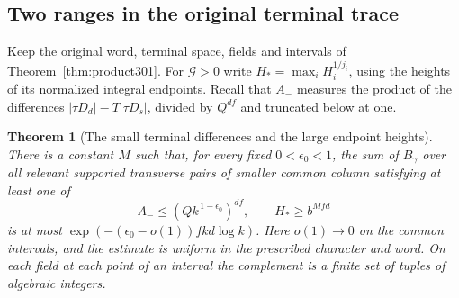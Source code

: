 \documentclass[a4paper,11pt]{article}
\newtheorem{theorem}[proposition]{Theorem}
\theoremstyle{definition}
\theoremstyle{remark}
\numberwithin{equation}{section}
\begin{document}
\subsection{Two ranges in the original terminal trace}\label{nav:VII-59}
Keep the original word, terminal space, fields and intervals
of Theorem~\ref{thm:product301}. For \(\mathcal G>0\) write
\(H_*=\max_i H_i^{1/j_i}\), using the heights of its
normalized integral endpoints. Recall that \(A_-\) measures
the product of the differences
\(|\tau D_d|-T|\tau D_s|\), divided by \(Q^{df}\) and
truncated below at one.

\begin{theorem}[The small terminal differences and the large endpoint heights]\leavevmode
\label{thm:ranges301}
There is a constant \(M\) such that, for every fixed
\(0<\epsilon_0<1\), the sum of \(B_\gamma\) over all relevant
supported transverse pairs of smaller common column satisfying
at least one of
\[
             A_-\le (Q k^{\,1-\epsilon_0})^{df},
             \qquad H_*\ge b^{Mfd}
\]
is at most \(\exp(-(\epsilon_0-o(1))fkd\log k)\).
Here \(o(1)\to0\) on the common intervals, and the estimate
is uniform in the prescribed character and word. On each
field at each point of an interval the complement is a
finite set of tuples of algebraic integers.
\end{theorem}
\end{document}
